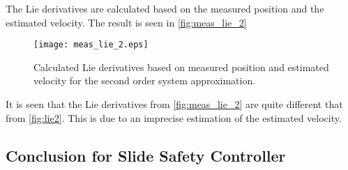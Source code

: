 The Lie derivatives are calculated based on the measured position and the estimated velocity. The result is seen in \autoref{fig:meas_lie_2}
\begin{figure}[H]
	\center
		\texttt{[image: meas\_lie\_2.eps]}
	\caption{Calculated Lie derivatives based on measured position and estimated velocity for the second order system approximation. }
    \label{fig:meas_lie_2}
\end{figure}
It is seen that the Lie derivatives from \autoref{fig:meas_lie_2} are quite different that from \autoref{fig:lie2}. This is due to an imprecise estimation of the estimated velocity.
\subsection{Conclusion for Slide Safety Controller}\label{subsec:conclusion-slide-safety}

